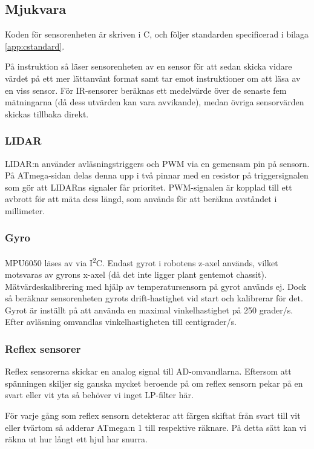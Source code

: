\documentclass[a4paper,11pt]{article}
\begin{document}
\subsection{Mjukvara}

Koden för sensorenheten är skriven i C, och följer standarden specificerad i bilaga \ref{app:cstandard}.

På instruktion så läser sensorenheten av en sensor för att sedan skicka vidare värdet på ett mer lättanvänt format samt tar emot instruktioner om att läsa av en viss sensor. För IR-sensorer beräknas ett medelvärde över de senaste fem mätningarna (då dess utvärden kan vara avvikande), medan övriga sensorvärden skickas tillbaka direkt.

\subsubsection{LIDAR}
LIDAR:n använder avläsningstriggers och PWM via en gemensam pin på sensorn. På ATmega-sidan delas denna upp i två pinnar med en resistor på triggersignalen som gör att LIDARns signaler får prioritet. PWM-signalen är kopplad till ett avbrott för att mäta dess längd, som används för att beräkna avståndet i millimeter.

\subsubsection{Gyro}
MPU6050 läses av via I\textsuperscript{2}C. Endast gyrot i robotens z-axel används, vilket motsvaras av gyrons x-axel (då det inte ligger plant gentemot chassit). Mätvärdeskalibrering med hjälp av temperatursensorn på gyrot används ej. Dock så beräknar sensorenheten gyrots drift-hastighet vid start och kalibrerar för det. Gyrot är inställt på att använda en maximal vinkelhastighet på 250 grader/s. Efter avläsning omvandlas vinkelhastigheten till centigrader/s.

\subsubsection{Reflex sensorer}
Reflex sensorerna skickar en analog signal till AD-omvandlarna. Eftersom att spänningen skiljer sig ganska mycket beroende på om reflex sensorn pekar på en svart eller vit yta så behöver vi inget LP-filter här.

För varje gång som reflex sensorn detekterar att färgen skiftat från svart till vit eller tvärtom så adderar ATmega:n 1 till respektive räknare. På detta sätt kan vi räkna ut hur långt ett hjul har snurra.
\end{document}
